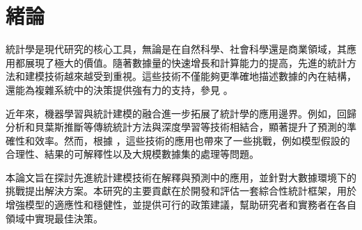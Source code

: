 \chapter{緒論}
\label{c:intro}

統計學是現代研究的核心工具，無論是在自然科學、社會科學還是商業領域，其應用都展現了極大的價值。隨著數據量的快速增長和計算能力的提高，先進的統計方法和建模技術越來越受到重視。這些技術不僅能夠更準確地描述數據的內在結構，還能為複雜系統中的決策提供強有力的支持，參見 \cite{Alpher02}。

近年來，機器學習與統計建模的融合進一步拓展了統計學的應用邊界。例如，回歸分析和貝葉斯推斷等傳統統計方法與深度學習等技術相結合，顯著提升了預測的準確性和效率。然而，根據 \cite{Alpher03}，這些技術的應用也帶來了一些挑戰，例如模型假設的合理性、結果的可解釋性以及大規模數據集的處理等問題。

本論文旨在探討先進統計建模技術在解釋與預測中的應用，並針對大數據環境下的挑戰提出解決方案。本研究的主要貢獻在於開發和評估一套綜合性統計框架，用於增強模型的適應性和穩健性，並提供可行的政策建議，幫助研究者和實務者在各自領域中實現最佳決策。